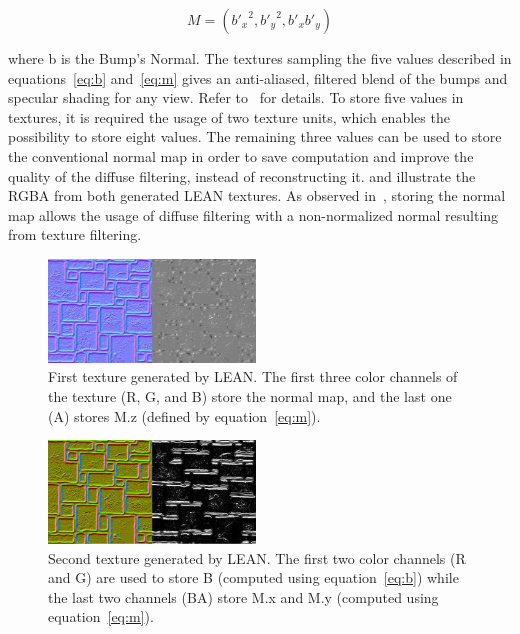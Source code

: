 \documentclass[10pt, conference]{IEEEtran}
\begin{document}
\begin{equation}
\label{eq:m}
M = ({b'_{x}}^{2}, {b'_{y}}^{2}, b'_{x}b'_{y})
\end{equation}

where b is the Bump's Normal. The textures sampling the five values described in equations~\ref{eq:b} and~\ref{eq:m} gives an anti-aliased, filtered blend of the bumps and specular shading for any view. Refer to~\cite{Olano:2010:LM:1730804.1730834} for details. To store five values in textures, it is required the usage of two texture units, which enables the possibility to store eight values. The remaining three values can be used to store the conventional normal map in order to save computation and improve the quality of the diffuse filtering, instead of reconstructing it.  and  illustrate the RGBA from both generated LEAN textures. As observed in~\cite{Kilgard00apractical}, storing the normal map allows the usage of diffuse filtering with a non-normalized normal resulting from texture filtering.

\begin{figure}[here]
\includegraphics[width=0.49\textwidth]{figs/Lean1.png}
\caption{First texture generated by LEAN. The first three color channels of the texture (R, G, and B) store the normal map, and the last one (A) stores M.z (defined by equation~\ref{eq:m}).}
\label{fig:Lean1}
\end{figure}

\begin{figure}[here]
\includegraphics[width=0.49\textwidth]{figs/Lean2.png}
\caption{Second texture generated by LEAN. The first two color channels (R and G) are used to store B (computed using equation~\ref{eq:b}) while the last two channels (BA) store M.x and M.y (computed using equation~\ref{eq:m}).}
\label{fig:Lean2}
\end{figure}
\end{document}
